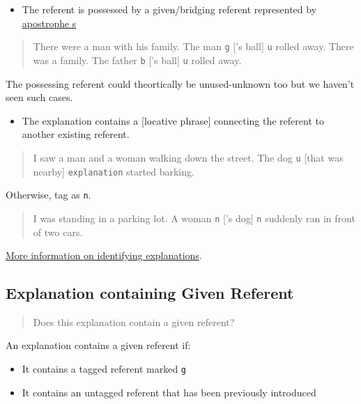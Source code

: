 \documentclass[
]{book}
\providecommand{\tightlist}{%
  \setlength{\itemsep}{0pt}\setlength{\parskip}{0pt}}
\begin{document}
\begin{itemize}
\tightlist
\item
  The referent is possessed by a given/bridging referent represented by \protect\hyperlink{apostrophe-s}{apostrophe s}
\end{itemize}

\begin{quote}
There were a man with his family. The man \texttt{g} {[}'s ball{]} \texttt{u} rolled away.
There was a family. The father \texttt{b} {[}'s ball{]} \texttt{u} rolled away.
\end{quote}

The possessing referent could theortically be unused-unknown too but we haven't seen such cases.

\begin{itemize}
\tightlist
\item
  The explanation contains a {[}locative phrase{]}
  connecting the referent to another existing referent.
\end{itemize}

\begin{quote}
I saw a man and a woman walking down the street.
The dog \texttt{u} {[}that was nearby{]} \texttt{explanation} started barking.
\end{quote}

Otherwise, tag as \texttt{n}.

\begin{quote}
I was standing in a parking lot. A woman \texttt{n} {[}'s dog{]} \texttt{n} suddenly ran in front of two cars.
\end{quote}

\protect\hyperlink{referent-explanations}{More information on identifying explanations}.

\hypertarget{explanation-containing-given-referent}{%
\subsection{Explanation containing Given Referent}\label{explanation-containing-given-referent}}

\begin{quote}
Does this explanation contain a given referent?
\end{quote}

An explanation contains a given referent if:

\begin{itemize}
\tightlist
\item
  It contains a tagged referent marked \texttt{g}
\item
  It contains an untagged referent that has been previously introduced
\end{itemize}
\end{document}
